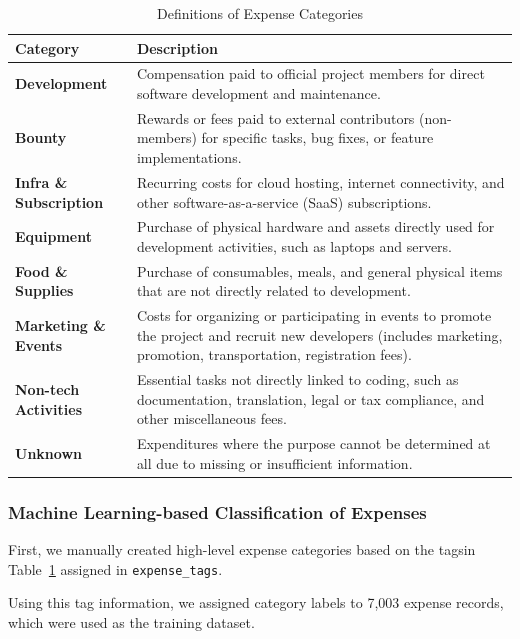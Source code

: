 \documentclass[11pt]{ist-thesis-lt}
\begin{document}
\begin{table}[htbp]
    \centering
    \caption{Definitions of Expense Categories}\label{tab:expense-categories}
    \begin{tabular}{lp{10cm}}
        \toprule
        Category & Description \\
        \midrule
        \textbf{Development} & Compensation paid to official project members for direct software development and maintenance. \\
        \textbf{Bounty} & Rewards or fees paid to external contributors (non-members) for specific tasks, bug fixes, or feature implementations. \\
        \textbf{Infra \& Subscription} & Recurring costs for cloud hosting, internet connectivity, and other software-as-a-service (SaaS) subscriptions. \\
        \textbf{Equipment} & Purchase of physical hardware and assets directly used for development activities, such as laptops and servers. \\
        \textbf{Food \& Supplies} & Purchase of consumables, meals, and general physical items that are not directly related to development. \\
        \textbf{Marketing \& Events} & Costs for organizing or participating in events to promote the project and recruit new developers (includes marketing, promotion, transportation, registration fees). \\
        \textbf{Non-tech Activities} & Essential tasks not directly linked to coding, such as documentation, translation, legal or tax compliance, and other miscellaneous fees. \\
        \textbf{Unknown} & Expenditures where the purpose cannot be determined at all due to missing or insufficient information. \\
        \bottomrule
    \end{tabular}
\end{table}

\subsubsection{Machine Learning-based Classification of Expenses}

First, we manually created high-level expense categories based on the tagsin Table~\ref{tab:expense-categories} assigned in \texttt{expense\_tags}.

Using this tag information, we assigned category labels to 7,003 expense records, which were used as the training dataset.
\end{document}

